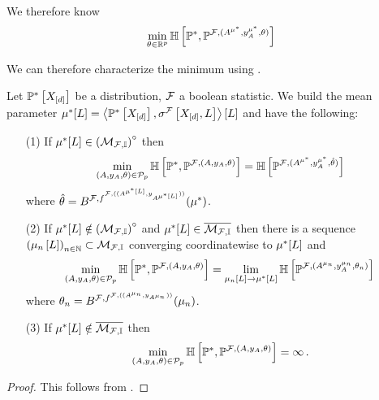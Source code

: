 We therefore know
\begin{align*}
    \min_{\theta\in\mathbb{R}^{p}} \mathbb{H}\left[\mathbb{P}^*,\mathbb{P}^{\mathcal{F},(A^{\mu^*},y_{A}^{\mu^*},\theta)}\right]
\end{align*}

We can therefore characterize the minimum using .

\begin{theorem}
    \label{the:minCrossEntropyHLN}
    Let $\mathbb{P}^*\left[X_{[d]}\right]$ be a distribution, $\mathcal{F}$ a boolean statistic.%
    We build the mean parameter $\mu^*[L]=\left\langle \mathbb{P}^*\left[X_{[d]}\right],\sigma^{\mathcal{F}}\left[X_{[d]},L\right]\right\rangle \left[ L \right]$ and have the following:
    \begin{itemize}
        \item[(1)] If $\mu^*[L] \in {\left(\mathcal{M}_{\mathcal{F},\mathbb{I}}\right)}^{\circ}$ then
        \begin{align*}
            \min_{(A,y_{A},\theta)\in\mathcal{P}_{p}} \mathbb{H}\left[\mathbb{P}^*,\mathbb{P}^{\mathcal{F},(A,y_{A},\theta)}\right]
            = \mathbb{H}\left[\mathbb{P}^{\mathcal{F},(A^{\mu^*},y_{A}^{\mu^*},\hat{\theta})}\right]
        \end{align*}
        where $\hat{\theta}=B^{\mathcal{F},f^{\mathcal{F},((A^{\mu^*[L]},y_{A^{\mu^*[L]}}))}}(\mu^*)$.
        \item[(2)] If $\mu^*[L] \notin {\left(\mathcal{M}_{\mathcal{F},\mathbb{I}}\right)}^{\circ}$ and $\mu^*[L]\in\overline{\mathcal{M}_{\mathcal{F},\mathbb{I}}}$ then there is a sequence $\left(\mu_{n}\left[L\right]\right)_{n\in\mathbb{N}}\subset\mathcal{M}_{\mathcal{F},\mathbb{I}}$ converging coordinatewise to $\mu^*[L]$ and
        \begin{align*}
            \min_{(A,y_{A},\theta)\in\mathcal{P}_{p}} \mathbb{H}\left[\mathbb{P}^*,\mathbb{P}^{\mathcal{F},(A,y_{A},\theta)}\right]
            = \lim_{\mu_{n}\left[L\right]\rightarrow\mu^*[L]}
            \mathbb{H}\left[\mathbb{P}^{\mathcal{F},(A^{\mu_{n}},y_{A}^{\mu_{n}},\theta_{n})}\right]\,
        \end{align*}
        where $\theta_{n}=B^{\mathcal{F},f^{\mathcal{F},((A^{\mu_{n}},y_{A^{\mu_{n}}}))}}(\mu_{n})$.
        \item[(3)] If $\mu^*[L]\notin\overline{\mathcal{M}_{\mathcal{F},\mathbb{I}}}$ then
        \begin{align*}
            \min_{(A,y_{A},\theta)\in\mathcal{P}_{p}} \mathbb{H}\left[\mathbb{P}^*,\mathbb{P}^{\mathcal{F},(A,y_{A},\theta)}\right]
            = \infty \, .
        \end{align*}
    \end{itemize}
\end{theorem}
\begin{proof}
    This follows from .
\end{proof}

